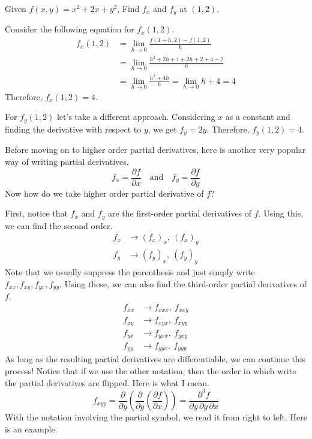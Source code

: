 \documentclass[../../../main.tex]{subfiles}
\begin{document}
\begin{problem}{}{}
Given $f(x, y) = x^2 + 2x + y^2$, Find $f_x$ and $f_y$ at $(1, 2)$.
\end{problem}
\begin{solution}
Consider the following equation for $f_x(1, 2)$.
\begin{align*}
    f_x (1, 2)
    &= \lim_{h \to 0} \frac{f(1 + h, 2) - f(1, 2)}{h} \\
    &= \lim_{h \to 0} \frac{h^2 + 2h + 1 + 2h + 2 + 4 - 7}{h} \\
    &= \lim_{h \to 0} \frac{h^2 + 4h}{h}
    = \lim_{h \to 0} h + 4
    = 4
\end{align*}
Therefore, $f_x(1, 2) = 4$.

For $f_y(1, 2)$ let's take a different approach. Considering $x$
as a constant and finding the derivative with respect to $y$,
we get $f_y = 2y$. Therefore, $f_y(1, 2) = 4$.
\end{solution}

Before moving on to higher order partial derivatives, here is
another very popular way of writing partial derivatives.
\[
f_x = \frac{\partial f}{\partial x}
\quad\text{and}\quad
f_y = \frac{\partial f}{\partial y}
\]
Now how do we take higher order partial derivative of $f$?

First, notice that $f_x$ and $f_y$ are the first-order partial
derivatives of $f$. Using this, we can find the second order.
\begin{align*}
    f_x &\rightarrow (f_x)_x,\ (f_x)_y \\
    f_y &\rightarrow (f_y)_x,\ (f_y)_y
\end{align*}
Note that we usually suppress the parenthesis and just simply write
$f_{xx}, f_{xy}, f_{yx}, f_{yy}$. Using these, we can also find the
third-order partial derivatives of $f$.
\begin{align*}
    f_{xx} &\rightarrow f_{xxx},\ f_{xxy} \\
    f_{xy} &\rightarrow f_{xyx},\ f_{xyy} \\
    f_{yx} &\rightarrow f_{yxx},\ f_{yxy} \\
    f_{yy} &\rightarrow f_{yyx},\ f_{yyy}
\end{align*}
As long as the resulting partial derivatives are differentiable,
we can continue this process! Notice that if we use the other
notation, then the order in which write the partial derivatives
are flipped. Here is what I mean.
\[
f_{xyy}
= \frac{\partial}{\partial y} \left(
    \frac{\partial}{\partial y} \left(
        \frac{\partial f}{\partial x}
    \right)
\right)
= \frac{\partial^3 f}{\partial y\, \partial y\, \partial x}
\]
With the notation involving the partial symbol, we read it from
right to left. Here is an example.
\end{document}
